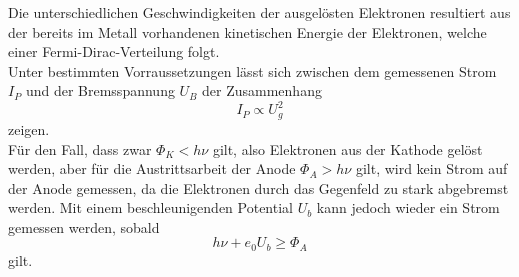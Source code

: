 \noindent
Die unterschiedlichen Geschwindigkeiten der ausgelösten Elektronen resultiert aus der bereits im Metall vorhandenen kinetischen Energie der 
Elektronen, welche einer Fermi-Dirac-Verteilung folgt. 
\\\noindent
Unter bestimmten Vorraussetzungen lässt sich zwischen dem gemessenen Strom $I_{P}$ und der Bremsspannung $U_B$ der Zusammenhang 
\begin{equation*}
    I_{P}\propto U^2_g
\end{equation*}
zeigen. 
\\\noindent
Für den Fall, dass zwar $\Phi_K<h\nu$ gilt, also Elektronen aus der Kathode gelöst werden, aber für die Austrittsarbeit der Anode 
$\Phi_A>h\nu$ gilt, wird kein Strom auf der Anode gemessen, da die Elektronen durch das Gegenfeld zu stark abgebremst werden.
Mit einem beschleunigenden Potential $U_b$ kann jedoch wieder ein Strom gemessen werden, sobald 
\begin{equation*}
    h\nu+e_0U_{b}\geq \Phi_A
\end{equation*}
gilt.